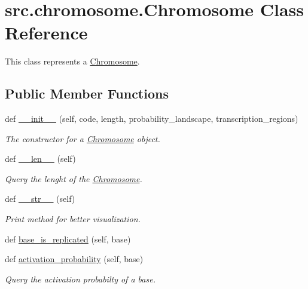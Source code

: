 \hypertarget{classsrc_1_1chromosome_1_1Chromosome}{}\section{src.\+chromosome.\+Chromosome Class Reference}
\label{classsrc_1_1chromosome_1_1Chromosome}


This class represents a \mbox{\hyperlink{classsrc_1_1chromosome_1_1Chromosome}{Chromosome}}.  


\subsection*{Public Member Functions}
\begin{DoxyCompactItemize}
\item 
def \mbox{\hyperlink{classsrc_1_1chromosome_1_1Chromosome_af61c9d25ac58a73cfd3805b0691c67d5}{\+\_\+\+\_\+init\+\_\+\+\_\+}} (self, code, length, probability\+\_\+landscape, transcription\+\_\+regions)
\begin{DoxyCompactList}\small\item\em The constructor for a \mbox{\hyperlink{classsrc_1_1chromosome_1_1Chromosome}{Chromosome}} object. \end{DoxyCompactList}\item 
def \mbox{\hyperlink{classsrc_1_1chromosome_1_1Chromosome_ac99d604dbe5ec7582bcaabe791ce9767}{\+\_\+\+\_\+len\+\_\+\+\_\+}} (self)
\begin{DoxyCompactList}\small\item\em Query the lenght of the \mbox{\hyperlink{classsrc_1_1chromosome_1_1Chromosome}{Chromosome}}. \end{DoxyCompactList}\item 
def \mbox{\hyperlink{classsrc_1_1chromosome_1_1Chromosome_a22eb8d92cf80438304468a9a80c0ffe5}{\+\_\+\+\_\+str\+\_\+\+\_\+}} (self)
\begin{DoxyCompactList}\small\item\em Print method for better visualization. \end{DoxyCompactList}\item 
def \mbox{\hyperlink{classsrc_1_1chromosome_1_1Chromosome_a3f37683e2a0d2f50341c3d97f8344c73}{base\+\_\+is\+\_\+replicated}} (self, base)
\item 
def \mbox{\hyperlink{classsrc_1_1chromosome_1_1Chromosome_a8e82cfd0fb5a5ed11da3792fa759a72d}{activation\+\_\+probability}} (self, base)
\begin{DoxyCompactList}\small\item\em Query the activation probabilty of a base. \end{DoxyCompactList}\item 

\end{DoxyCompactItemize}
